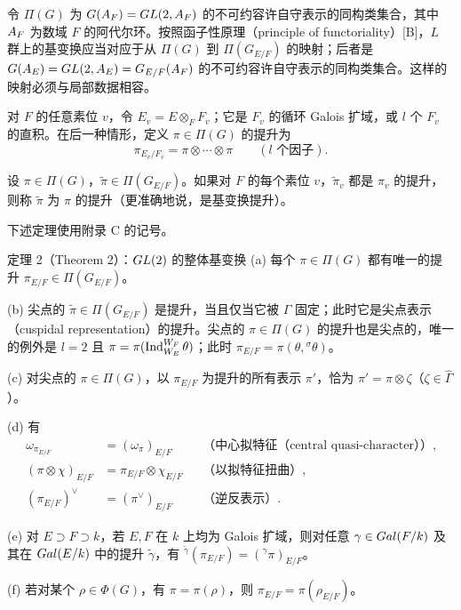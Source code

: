 令 $\Pi(G)$ 为 $G(A_F)=GL(2,A_F)$ 的不可约容许自守表示的同构类集合，其中 $A_F$ 为数域 $F$ 的阿代尔环。按照函子性原理（principle of functoriality）[B]，$L$ 群上的基变换应当对应于从 $\Pi(G)$ 到 $\Pi(G_{E/F})$ 的映射；后者是 $G(A_E)=GL(2,A_E)=G_{E/F}(A_F)$ 的不可约容许自守表示的同构类集合。这样的映射必须与局部数据相容。

对 $F$ 的任意素位 $v$，令 $E_v=E\otimes_FF_v$；它是 $F_v$ 的循环 Galois 扩域，或 $l$ 个 $F_v$ 的直积。在后一种情形，定义 $\pi\in\Pi(G)$ 的提升为
\[
 \pi_{E_v/F_v}=\pi\otimes\cdots\otimes\pi\qquad(l\text{ 个因子}).
\]

设 $\pi\in\Pi(G)$，$\widetilde\pi\in\Pi(G_{E/F})$。如果对 $F$ 的每个素位 $v$，$\widetilde\pi_v$ 都是 $\pi_v$ 的提升，则称 $\widetilde\pi$ 为 $\pi$ 的提升（更准确地说，是基变换提升）。

下述定理使用附录 C 的记号。

\begin{originaltheorem}{定理 2（Theorem 2）：$GL(2)$ 的整体基变换}
(a) 每个 $\pi\in\Pi(G)$ 都有唯一的提升 $\pi_{E/F}\in\Pi(G_{E/F})$。

(b) 尖点的 $\widetilde\pi\in\Pi(G_{E/F})$ 是提升，当且仅当它被 $\Gamma$ 固定；此时它是尖点表示（cuspidal representation）的提升。尖点的 $\pi\in\Pi(G)$ 的提升也是尖点的，唯一的例外是 $l=2$ 且 $\pi=\pi(\operatorname{Ind}_{W_E}^{W_F}\theta)$；此时 $\pi_{E/F}=\pi(\theta,{}^\sigma\theta)$。

(c) 对尖点的 $\pi\in\Pi(G)$，以 $\pi_{E/F}$ 为提升的所有表示 $\pi'$，恰为 $\pi'=\pi\otimes\zeta$（$\zeta\in\widehat\Gamma$）。

(d) 有
\[
 \begin{aligned}
 \omega_{\pi_{E/F}}&=(\omega_\pi)_{E/F}&&\text{（中心拟特征（central quasi-character））},\\
 (\pi\otimes\chi)_{E/F}&=\pi_{E/F}\otimes\chi_{E/F}&&\text{（以拟特征扭曲）},\\
 (\pi_{E/F})^\vee&=(\pi^\vee)_{E/F}&&\text{（逆反表示）}.
 \end{aligned}
\]

(e) 对 $E\supset F\supset k$，若 $E,F$ 在 $k$ 上均为 Galois 扩域，则对任意 $\gamma\in Gal(F/k)$ 及其在 $Gal(E/k)$ 中的提升 $\widetilde\gamma$，有 ${}^{\widetilde\gamma}(\pi_{E/F})=({}^\gamma\pi)_{E/F}$。

(f) 若对某个 $\rho\in\Phi(G)$，有 $\pi=\pi(\rho)$，则 $\pi_{E/F}=\pi(\rho_{E/F})$。
\end{originaltheorem}

